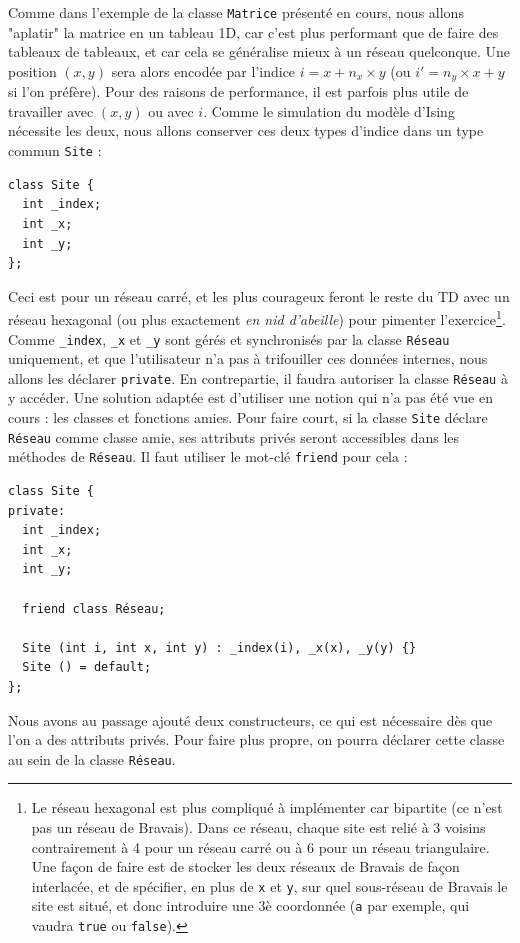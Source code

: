 \documentclass{book}
\newcommand{\inline}[1]{\texttt{#1}}
\begin{document}
Comme dans l'exemple de la classe \inline{Matrice} présenté en cours, nous allons "aplatir" la matrice en un tableau 1D, car c'est plus performant que de faire des tableaux de tableaux, et car cela se généralise mieux à un réseau quelconque. Une position $(x,y)$ sera alors encodée par l'indice $i = x + n_x \times y$ (ou $i' = n_y \times x + y$ si l'on préfère). Pour des raisons de performance, il est parfois plus utile de travailler avec $(x,y)$ ou avec $i$. Comme le simulation du modèle d'Ising nécessite les deux, nous allons conserver ces deux types d'indice dans un type commun \inline{Site} :
\begin{verbatim}
class Site {
  int _index;
  int _x;
  int _y;
};
\end{verbatim}
Ceci est pour un réseau carré, et les plus courageux feront le reste du TD avec un réseau hexagonal (ou plus exactement \emph{en nid d'abeille}) pour pimenter l'exercice\footnote{Le réseau hexagonal est plus compliqué à implémenter car bipartite (ce n'est pas un réseau de Bravais). Dans ce réseau, chaque site est relié à 3 voisins contrairement à 4 pour un réseau carré ou à 6 pour un réseau triangulaire. Une façon de faire est de stocker les deux réseaux de Bravais de façon interlacée, et de spécifier, en plus de \inline{x} et \inline{y}, sur quel sous-réseau de Bravais le site est situé, et donc introduire une 3è coordonnée (\inline{a} par exemple, qui vaudra \inline{true} ou \inline{false}).}. Comme \inline{_index}, \inline{_x} et \inline{_y} sont gérés et synchronisés par la classe \inline{Réseau} uniquement, et que l'utilisateur n'a pas à trifouiller ces données internes, nous allons les déclarer \inline{private}. En contrepartie, il faudra autoriser la classe \inline{Réseau} à y accéder. Une solution adaptée est d'utiliser une notion qui n'a pas été vue en cours : les classes et fonctions amies. Pour faire court, si la classe \inline{Site} déclare \inline{Réseau} comme classe amie, ses attributs privés seront accessibles dans les méthodes de \inline{Réseau}. Il faut utiliser le mot-clé \inline{friend} pour cela :
\begin{verbatim}
class Site {
private:
  int _index;
  int _x;
  int _y;

  friend class Réseau;

  Site (int i, int x, int y) : _index(i), _x(x), _y(y) {}
  Site () = default;
};
\end{verbatim}
Nous avons au passage ajouté deux constructeurs, ce qui est nécessaire dès que l'on a des attributs privés. Pour faire plus propre, on pourra déclarer cette classe au sein de la classe \inline{Réseau}.\\
\end{document}

